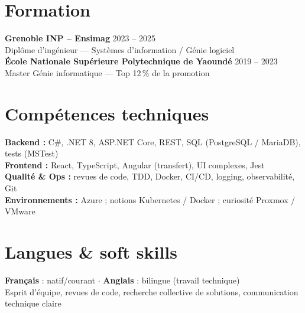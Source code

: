 \documentclass[10pt,a4paper]{article}
\begin{document}
\section{Formation}
\textbf{Grenoble INP -- Ensimag} \hfill 2023 -- 2025\\
Dipl\^ome d'ing\'enieur --- Syst\`emes d'information / G\'enie logiciel\\[2pt]
\textbf{\'Ecole Nationale Sup\'erieure Polytechnique de Yaound\'e} \hfill 2019 -- 2023\\
Master G\'enie informatique --- Top 12\,\% de la promotion

\section{Comp\'etences techniques}
\textbf{Backend :} C\#, .NET 8, ASP.NET Core, REST, SQL (PostgreSQL / MariaDB), tests (MSTest)\\
\textbf{Frontend :} React, TypeScript, Angular (transfert), UI complexes, Jest\\
\textbf{Qualit\'e \& Ops :} revues de code, TDD, Docker, CI/CD, logging, observabilit\'e, Git\\
\textbf{Environnements :} Azure ; notions Kubernetes / Docker ; curiosit\'e Proxmox / VMware

\section{Langues \& soft skills}
\textbf{Fran\c{c}ais} : natif/courant $\cdot$ \textbf{Anglais} : bilingue (travail technique)\\
Esprit d'\'equipe, revues de code, recherche collective de solutions, communication technique claire
\end{document}

